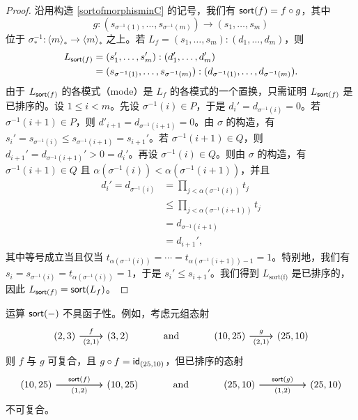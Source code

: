 \begin{proof}
    沿用构造 \ref{sortofmorphisminC} 的记号，我们有 $\mathsf{sort}(f) = f \circ g$，其中
    \[
    g : (s_{\sigma^{-1}(1)},\dots,s_{\sigma^{-1}(m)}) \to (s_1,\dots,s_m)
    \]
    位于 $\sigma^{-1}_*: \langle m \rangle_* \to \langle m \rangle_*$ 之上。若 $L_f = (s_1,\dots,s_m):(d_1,\dots,d_m)$，则
    \begin{align*}
    L_{\mathsf{sort}(f)} & = (s_1',\dots,s_m'):(d_1',\dots,d_m') \\
    & = (s_{\sigma^{-1}(1)},\dots,s_{\sigma^{-1}(m)}):(d_{\sigma^{-1}(1)},\dots,d_{\sigma^{-1}(m)}). 
    \end{align*}
    由于 $L_{\mathsf{sort}(f)}$ 的各模式（mode）是 $L_f$ 的各模式的一个置换，只需证明 $L_{\mathsf{sort}(f)}$ 是已排序的。设 $1 \leq i <m$。先设 $\sigma^{-1}(i) \in P$，于是 $d_i' = d_{\sigma^{-1}(i)} = 0$。若 $\sigma^{-1}(i+1) \in P$，则 $d'_{i+1} = d_{\sigma^{-1}(i+1)} = 0$。由 $\sigma$ 的构造，有 $s_i' = s_{\sigma^{-1}(i)} \leq s_{\sigma^{-1}(i+1)} = s_{i+1}'$。若 $\sigma^{-1}(i+1) \in Q$，则 $d_{i+1}' = d_{\sigma^{-1}(i+1)}' > 0 = d_i'$。再设 $\sigma^{-1}(i) \in Q$。则由 $\sigma$ 的构造，有 $\sigma^{-1}(i+1) \in Q$ 且 $\alpha(\sigma^{-1}(i)) < \alpha(\sigma^{-1}(i+1))$，并且
    \begin{align*}
    d_i' = d_{\sigma^{-1}(i)} & = \prod_{j < \alpha(\sigma^{-1}(i))} t_j \\
    & \leq \prod_{j<\alpha(\sigma^{-1}(i+1))} t_j \\
    & = d_{\sigma^{-1}(i+1)}\\
    & = d_{i+1}',
    \end{align*}
    其中等号成立当且仅当 $t_{\alpha(\sigma^{-1}(i))} =  \cdots = t_{\alpha(\sigma^{-1}(i+1))-1} = 1$。特别地，我们有 $s_i = s_{\sigma^{-1}(i)} = t_{\alpha(\sigma^{-1}(i))} = 1$，于是 $s_i' \leq s_{i+1}'$。我们得到 $L_{\text{sort(f)}}$ 是已排序的，因此 $L_{\mathsf{sort}(f)} = \mathsf{sort}(L_f)$。 
\end{proof}

\begin{remark}
    运算 $\mathsf{sort}(-)$ 不具函子性。例如，考虑元组态射
    \[ \begin{tikzcd} (2,3)\ar[r,"f"] \ar[r,swap,"(2{,}1)"] & (3,2) & \text{ and } & (10,25)\ar[r,"g"] \ar[r,swap,"(2{,}1)"] & (25,10)\end{tikzcd} \]
    则 $f$ 与 $g$ 可复合，且 $g \circ f = \mathsf{id}_{(25,10)}$，但已排序的态射
    \[ \begin{tikzcd} (10,25)\ar[rr,"\sort(f)"] \ar[rr,swap,"(1{,}2)"] & & (10,25) & \text{ and } & (25,10)\ar[rr,"\sort(g)"] \ar[rr,swap,"(1{,}2)"] & & (25,10)\end{tikzcd} \]
    不可复合。
\end{remark}

